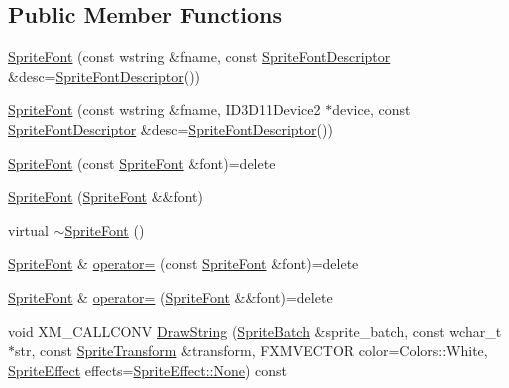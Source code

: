 \subsection*{Public Member Functions}
\begin{DoxyCompactItemize}
\item 
\hyperlink{classmage_1_1_sprite_font_a081eb41de898a96ecd8f0b5bde3987d9}{Sprite\+Font} (const wstring \&fname, const \hyperlink{structmage_1_1_sprite_font_descriptor}{Sprite\+Font\+Descriptor} \&desc=\hyperlink{structmage_1_1_sprite_font_descriptor}{Sprite\+Font\+Descriptor}())
\item 
\hyperlink{classmage_1_1_sprite_font_aad86ca75acba684a4cbc10c84f64ca9f}{Sprite\+Font} (const wstring \&fname, I\+D3\+D11\+Device2 $\ast$device, const \hyperlink{structmage_1_1_sprite_font_descriptor}{Sprite\+Font\+Descriptor} \&desc=\hyperlink{structmage_1_1_sprite_font_descriptor}{Sprite\+Font\+Descriptor}())
\item 
\hyperlink{classmage_1_1_sprite_font_a5df751fe06abda25127fdd9222e41948}{Sprite\+Font} (const \hyperlink{classmage_1_1_sprite_font}{Sprite\+Font} \&font)=delete
\item 
\hyperlink{classmage_1_1_sprite_font_ad1ba3d6947515b36b40b037a2760df29}{Sprite\+Font} (\hyperlink{classmage_1_1_sprite_font}{Sprite\+Font} \&\&font)
\item 
virtual \hyperlink{classmage_1_1_sprite_font_acbf50687b4a5dbb2ff1ad73ecc89b7f1}{$\sim$\+Sprite\+Font} ()
\item 
\hyperlink{classmage_1_1_sprite_font}{Sprite\+Font} \& \hyperlink{classmage_1_1_sprite_font_a3f95359a336adc87088eefe3103a770b}{operator=} (const \hyperlink{classmage_1_1_sprite_font}{Sprite\+Font} \&font)=delete
\item 
\hyperlink{classmage_1_1_sprite_font}{Sprite\+Font} \& \hyperlink{classmage_1_1_sprite_font_ab00b7f5c2740faf52ea778d94ae704bd}{operator=} (\hyperlink{classmage_1_1_sprite_font}{Sprite\+Font} \&\&font)=delete
\item 
void X\+M\+\_\+\+C\+A\+L\+L\+C\+O\+NV \hyperlink{classmage_1_1_sprite_font_a02498ef183874ed31c408fc142a8231e}{Draw\+String} (\hyperlink{classmage_1_1_sprite_batch}{Sprite\+Batch} \&sprite\+\_\+batch, const wchar\+\_\+t $\ast$str, const \hyperlink{structmage_1_1_sprite_transform}{Sprite\+Transform} \&transform, F\+X\+M\+V\+E\+C\+T\+OR color=Colors\+::\+White, \hyperlink{namespacemage_a9cfe18123066ba4236f548f9de75d881}{Sprite\+Effect} effects=\hyperlink{namespacemage_a5e7e18b0154373ce8fc942fe3f6b27fda6adf97f83acf6453d4a6a4b1070f3754}{Sprite\+Effect\+::\+None}) const

\end{DoxyCompactItemize}
